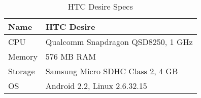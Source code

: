 \begin{table}
  \centering
  \caption{HTC Desire Specs}
  \begin{tabular}{ | l | l |}
    \hline
    Name    & HTC Desire                        \\ \hline
    CPU     & Qualcomm Snapdragon QSD8250, 1 GHz \\ \hline
    Memory  & 576 MB \ac{RAM}                   \\ \hline
    Storage & Samsung Micro SDHC Class 2, 4 GB  \\ \hline
    \ac{OS} & Android 2.2, Linux 2.6.32.15      \\ \hline
  \end{tabular}
  \label{tbl:device:desire}
\end{table}
